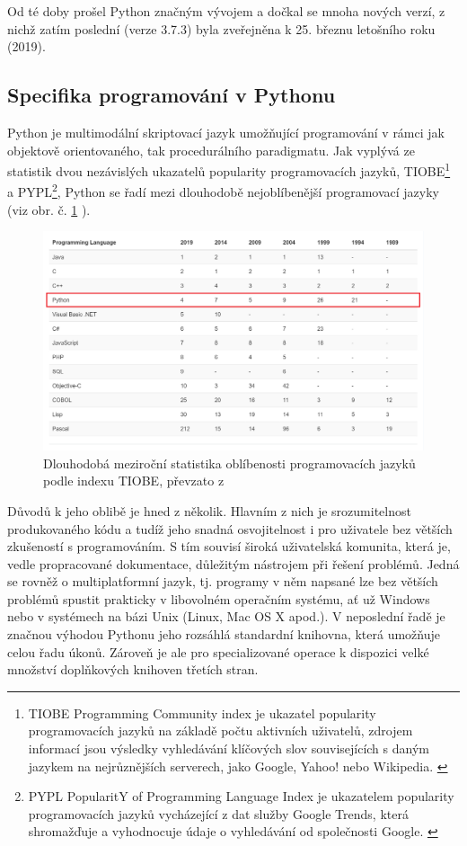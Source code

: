 \documentclass[a4paper, 12pt]{article}
\begin{document}
\noindent Od té doby prošel Python značným vývojem a dočkal se mnoha nových verzí, z nichž zatím poslední (verze 3.7.3) byla zveřejněna k 25. březnu letošního roku (2019). \cite{PythonVersion}

\subsection{Specifika programování v Pythonu} \label{sec:specifika}
Python je multimodální skriptovací jazyk umožňující programování v rámci jak objektově orientovaného, tak procedurálního paradigmatu. \cite{Python3Summerfield:1}
Jak vyplývá ze statistik dvou nezávislých ukazatelů popularity programovacích jazyků, TIOBE\footnote{TIOBE Programming Community index je ukazatel popularity programovacích jazyků na základě počtu aktivních uživatelů, zdrojem informací jsou výsledky vyhledávání klíčových slov souvisejících s daným jazykem na nejrůznějších serverech, jako Google, Yahoo! nebo Wikipedia. \cite{tiobe}} a PYPL\footnote{PYPL PopularitY of Programming Language Index je ukazatelem popularity programovacích jazyků vycházející z dat služby Google Trends, která shromažďuje a vyhodnocuje údaje o vyhledávání od společnosti Google. \cite{pypl}}, Python se řadí mezi dlouhodobě nejoblíbenější programovací jazyky (viz obr. č. \ref{fig:tiobe} \cite{tiobe}).

\begin{figure}[ht!]
    \centering
    \includegraphics[width=\linewidth]{tiobe.png}
    \caption{Dlouhodobá meziroční statistika oblíbenosti programovacích jazyků podle indexu TIOBE, převzato z \cite{tiobe}}
    \label{fig:tiobe}
\end{figure}

Důvodů k jeho oblibě je hned z několik. Hlavním z nich je srozumitelnost produkovaného kódu a tudíž jeho snadná osvojitelnost i pro uživatele bez větších zkušeností s programováním. S tím souvisí široká uživatelská komunita, která je, vedle propracované dokumentace, důležitým nástrojem při řešení problémů.  Jedná se rovněž o multiplatformní jazyk, tj. programy v něm napsané lze bez větších problémů spustit prakticky v libovolném operačním systému, ať už Windows nebo v systémech na bázi Unix (Linux, Mac OS X apod.). V neposlední řadě je značnou výhodou Pythonu jeho rozsáhlá standardní knihovna, která umožňuje celou řadu úkonů. Zároveň je ale pro specializované operace k dispozici velké množství doplňkových knihoven třetích stran.
\end{document}
